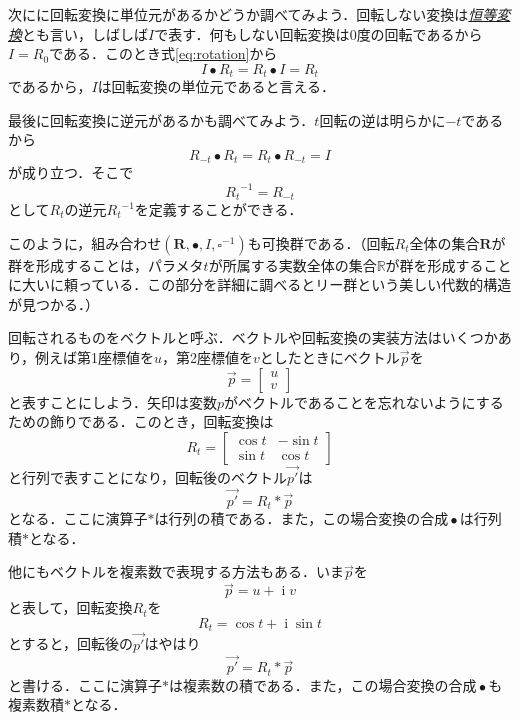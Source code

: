 \documentclass[a5paper,draft]{jsbook}
\newcommand{\keyword}[1]{{\underline{\emph{#1}}}}
\newcommand{\mathSet}[1]{\mathbf{#1}} %
\newcommand{\mathSpecialSet}[1]{\mathbb{#1}} %
\newcommand{\mathVectorVar}[1]{\vec{#1}}
\newcommand{\mathSomething}{\square}
\newcommand{\mathBinaryOperator}[1]{\operatorname{#1}}
\newcommand{\mathCompose}{\mathBinaryOperator{\bullet}}
\newcommand{\mathGroup}[4]{(#1,#2,#3,#4)}
\DeclareMathOperator{\mathI}{i}
\begin{document}
次にに回転変換に単位元があるかどうか調べてみよう．回転しない変換は\keyword{恒等変換}とも言い，しばしば$I$で表す．何もしない回転変換は$0$度の回転であるから$I=R_0$である．このとき式\eqref{eq:rotation}から
\begin{equation}
I\bullet R_t=R_t\bullet I=R_t
\end{equation}
であるから，$I$は回転変換の単位元であると言える．

最後に回転変換に逆元があるかも調べてみよう．$t$回転の逆は明らかに$-t$であるから
\begin{equation}
R_{-t}\bullet R_t=R_t\bullet R_{-t}=I
\end{equation}
が成り立つ．そこで
\begin{equation}
{R_t}^{-1}=R_{-t}
\end{equation}
として$R_t$の逆元${R_t}^{-1}$を定義することができる．

このように，組み合わせ$\mathGroup{\mathSet{R}}{\bullet}{I}{\mathSomething^{-1}}$も可換群である．（回転$R_t$全体の集合$\mathSet{R}$が群を形成することは，パラメタ$t$が所属する実数全体の集合$\mathSpecialSet{R}$が群を形成することに大いに頼っている．この部分を詳細に調べるとリー群という美しい代数的構造が見つかる．）

回転されるものをベクトルと呼ぶ．ベクトルや回転変換の実装方法はいくつかあり，例えば第1座標値を$u$，第2座標値を$v$としたときにベクトル$\mathVectorVar{p}$を
\begin{equation}
\mathVectorVar{p}=\begin{bmatrix}u\\v\end{bmatrix}
\end{equation}
と表すことにしよう．矢印は変数$p$がベクトルであることを忘れないようにするための飾りである．このとき，回転変換は
\begin{equation}
R_t=\begin{bmatrix}\cos t&-\sin t\\\sin t&\cos t\end{bmatrix}
\end{equation}
と行列で表すことになり，回転後のベクトル$\mathVectorVar{p'}$は
\begin{equation}
\mathVectorVar{p'}=R_t*\mathVectorVar{p}
\end{equation}
となる．ここに演算子$*$は行列の積である．また，この場合変換の合成$\mathCompose$は行列積$*$となる．

他にもベクトルを複素数で表現する方法もある．いま$\mathVectorVar{p}$を
\begin{equation}
\mathVectorVar{p}=u+\mathI v
\end{equation}
と表して，回転変換$R_t$を
\begin{equation}
R_t=\cos t+\mathI\sin t
\end{equation}
とすると，回転後の$\mathVectorVar{p'}$はやはり
\begin{equation}
\mathVectorVar{p'}=R_t*\mathVectorVar{p}
\end{equation}
と書ける．ここに演算子$*$は複素数の積である．また，この場合変換の合成$\mathCompose$も複素数積$*$となる．
\end{document}
